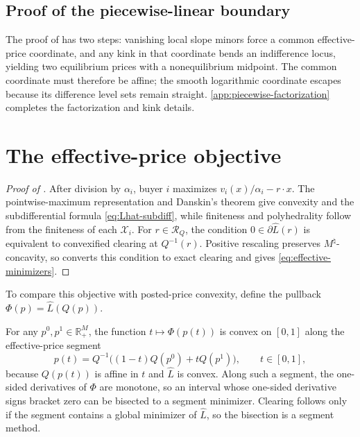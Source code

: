 \documentclass[11pt,a4paper,fleqn]{article}
\theoremstyle{plain}
\theoremstyle{definition}
\newcommand{\R}{\mathbb{R}}
\newcommand{\Xcal}{\mathcal{X}}
\begin{document}
\subsection{Proof of the piecewise-linear boundary}\label{subsec:piecewise}

The proof of  has two steps: vanishing local slope minors force a common effective-price coordinate, and any kink in that coordinate bends an indifference locus, yielding two equilibrium prices with a nonequilibrium midpoint. The common coordinate must therefore be affine; the smooth logarithmic coordinate escapes because its difference level sets remain straight. \ref{app:piecewise-factorization} completes the factorization and kink details.

\section{The effective-price objective}\label{sec:effective}

\begin{proof}[Proof of ]
After division by $\alpha_i$, buyer $i$ maximizes $v_i(x)/\alpha_i-r\cdot x$. The pointwise-maximum representation and Danskin's theorem give convexity and the subdifferential formula \eqref{eq:Lhat-subdiff}, while finiteness and polyhedrality follow from the finiteness of each $\Xcal_i$. For $r\in\mathcal R_Q$, the condition $0\in\partial\widehat L(r)$ is equivalent to convexified clearing at $Q^{-1}(r)$. Positive rescaling preserves $M^\natural$-concavity, so  converts this condition to exact clearing and gives \eqref{eq:effective-minimizers}.
\end{proof}

To compare this objective with posted-price convexity, define the pullback $\Phi(p)=\widehat L(Q(p))$.

For any $p^0,p^1\in\R_+^M$, the function $t\mapsto\Phi(p(t))$ is convex on $[0,1]$ along the effective-price segment
\begin{equation}\label{eq:geodesic}
p(t)=Q^{-1}\big((1-t)Q(p^0)+tQ(p^1)\big),
\qquad t\in[0,1],
\end{equation}
because $Q(p(t))$ is affine in $t$ and $\widehat L$ is convex. Along such a segment, the one-sided derivatives of $\Phi$ are monotone, so an interval whose one-sided derivative signs bracket zero can be bisected to a segment minimizer. Clearing follows only if the segment contains a global minimizer of $\widehat L$, so the bisection is a segment method.
\end{document}
